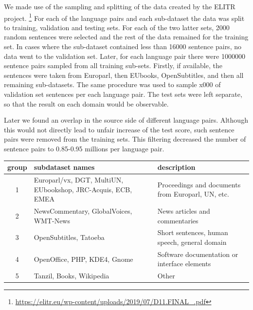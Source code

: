 We made use of the sampling and splitting of the data created by the ELITR project.%
\footnote{\url{https://elitr.eu/wp-content/uploads/2019/07/D11.FINAL\_.pdf}}
For each of the language pairs and each sub-dataset
the data was split to training, validation and testing sets.
For each of the two latter sets, 2000 random sentences were selected
and the rest of the data remained for the training set.
In cases where the sub-dataset contained less than 16000 sentence pairs,
no data went to the validation set.
Later, for each language pair there were 1000000 sentence pairs
sampled from all training sub-sets.
Firstly, if available, the sentences were taken from Europarl,
then EUbooks, OpenSubtitles, and then all remaining sub-datasets.
The same procedure was used to sample  x000 of validation set sentences
per each language pair.
The test sets were left separate, so that the result on each domain would be observable.

Later we found an overlap in the source side of different language pairs.
Although this would not directly lead to unfair increase of the test score,
such sentence pairs were removed from the training sets.
This filtering decreased the number of sentence pairs
to 0.85-0.95 millions per language pair.


\begin{table}[h!]
	\centering
	\begin{tabular}{c|p{}|p{}}
	\toprule
	     group & subdataset names  & description \\
	\midrule
	 1 &  Europarl/vx, DGT, MultiUN, EUbookshop, JRC-Acquis,
	      ECB, EMEA
	   &  Proceedings and documents from Europarl, UN, etc. \\
	 2 &  NewsCommentary, GlobalVoices, WMT-News 
	   &  News articles and commentaries \\
	 3 &  OpenSubtitles, Tatoeba
	   &  Short sentences, human speech, general domain \\
	 4 &  OpenOffice, PHP, KDE4, Gnome
	   &  Software documentation or interface elements \\
	 5 &  Tanzil, Books, Wikipedia
	   &  Other  \\
	\bottomrule
	\end{tabular}

	\label{tab:subdatasets_groups}
\end{table}

